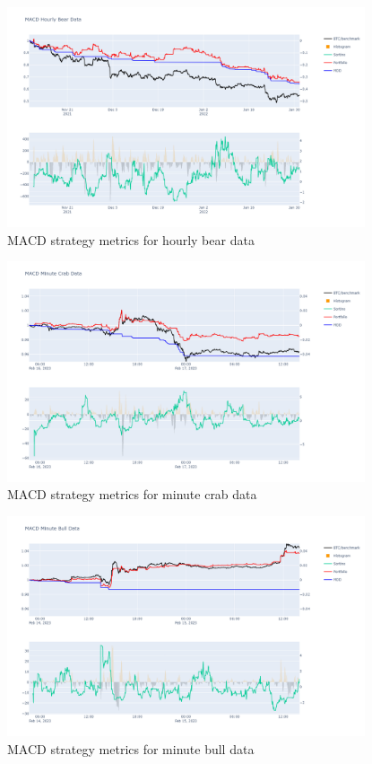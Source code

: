 \begin{figure}[H]
    \centering
    \includegraphics[width=0.94\textwidth]{graphics/results/02_macd_hourly_bear.png}
    \caption{MACD strategy metrics for hourly bear data}
    \label{gr:macd:HBr}
\end{figure}

\begin{figure}[H]
    \centering
    \includegraphics[width=0.94\textwidth]{graphics/results/02_macd_minute_crab.png}
    \caption{MACD strategy metrics for minute crab data}
    \label{gr:macd:mcr}
\end{figure}

\begin{figure}[H]
    \centering
    \includegraphics[width=0.94\textwidth]{graphics/results/02_macd_minute_bull.png}
    \caption{MACD strategy metrics for minute bull data}
    \label{gr:macd:mbu}
\end{figure}

